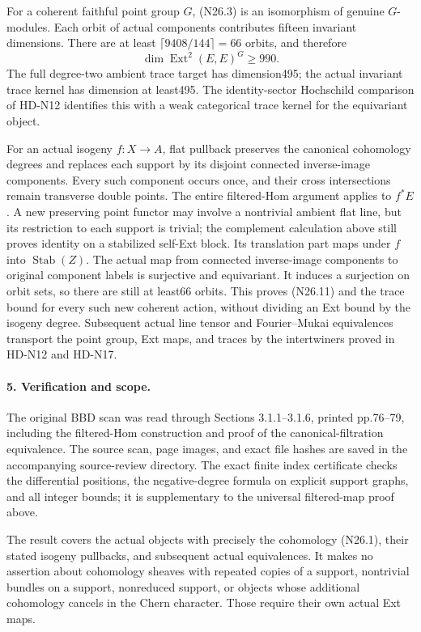 For a coherent faithful point group $G$, (N26.3) is an
isomorphism of genuine $G$-modules. Each orbit of actual
components contributes fifteen invariant dimensions.
There are at least $\lceil9408/144\rceil=66$ orbits, and
therefore
\[
                 \dim\operatorname{Ext}^2(E,E)^G\ge990.
                                                               \tag{N26.11}
\]
The full degree-two ambient trace target has dimension495;
the actual invariant trace kernel has dimension at least495.
The identity-sector Hochschild comparison of HD-N12
identifies this with a weak categorical trace kernel for
the equivariant object.

For an actual isogeny $f:X\to A$, flat pullback preserves
the canonical cohomology degrees and replaces each support
by its disjoint connected inverse-image components. Every
such component occurs once, and their cross intersections
remain transverse double points. The entire filtered-Hom
argument applies to $f^*E$. A new preserving point functor
may involve a nontrivial ambient flat line, but its
restriction to each support is trivial; the complement
calculation above still proves identity on a stabilized
self-Ext block. Its translation part maps under $f$ into
$\operatorname{Stab}(Z)$. The actual map from connected
inverse-image components to original component labels is
surjective and equivariant. It induces a surjection on
orbit sets, so there are still at least66 orbits. This
proves (N26.11) and the trace bound for every such new
coherent action, without dividing an Ext bound by the
isogeny degree. Subsequent actual line tensor and
Fourier--Mukai equivalences transport the point group,
Ext maps, and traces by the intertwiners proved in HD-N12
and HD-N17.

\paragraph{5. Verification and scope.}
The original BBD scan was read through Sections 3.1.1--3.1.6,
printed pp.76--79, including the filtered-Hom construction
and proof of the canonical-filtration equivalence. The
source scan, page images, and exact file hashes are saved
in the accompanying source-review directory. The exact
finite index certificate checks the differential positions,
the negative-degree formula on explicit support graphs,
and all integer bounds; it is supplementary to the
universal filtered-map proof above.

The result covers the actual objects with precisely the
cohomology (N26.1), their stated isogeny pullbacks, and
subsequent actual equivalences. It makes no assertion about
cohomology sheaves with repeated copies of a support,
nontrivial bundles on a support, nonreduced support, or
objects whose additional cohomology cancels in the Chern
character. Those require their own actual Ext maps.
